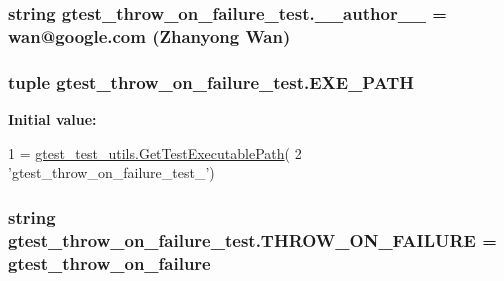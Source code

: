\subsubsection[{\+\_\+\+\_\+author\+\_\+\+\_\+}]{\setlength{\rightskip}{0pt plus 5cm}string gtest\+\_\+throw\+\_\+on\+\_\+failure\+\_\+test.\+\_\+\+\_\+author\+\_\+\+\_\+ = \textquotesingle{}wan@google.\+com (Zhanyong Wan)\textquotesingle{}}\label{namespacegtest__throw__on__failure__test_afd3c4d4809a79f0b4de8b2372cba5bb8}
\hypertarget{namespacegtest__throw__on__failure__test_a21b57c780e17de8f6aa8c88652b290be}{}
\subsubsection[{E\+X\+E\+\_\+\+P\+A\+T\+H}]{\setlength{\rightskip}{0pt plus 5cm}tuple gtest\+\_\+throw\+\_\+on\+\_\+failure\+\_\+test.\+E\+X\+E\+\_\+\+P\+A\+T\+H}\label{namespacegtest__throw__on__failure__test_a21b57c780e17de8f6aa8c88652b290be}
{\bfseries Initial value\+:}
\begin{DoxyCode}
1 = \hyperlink{namespacegtest__test__utils_a1bdf3cac86afa675ed37629b183048e9}{gtest\_test\_utils.GetTestExecutablePath}(
2     \textcolor{stringliteral}{'gtest\_throw\_on\_failure\_test\_'})
\end{DoxyCode}
\hypertarget{namespacegtest__throw__on__failure__test_af837d05b7ed8498aed8202c1d83d1e7a}{}
\subsubsection[{T\+H\+R\+O\+W\+\_\+\+O\+N\+\_\+\+F\+A\+I\+L\+U\+R\+E}]{\setlength{\rightskip}{0pt plus 5cm}string gtest\+\_\+throw\+\_\+on\+\_\+failure\+\_\+test.\+T\+H\+R\+O\+W\+\_\+\+O\+N\+\_\+\+F\+A\+I\+L\+U\+R\+E = \textquotesingle{}gtest\+\_\+throw\+\_\+on\+\_\+failure\textquotesingle{}}\label{namespacegtest__throw__on__failure__test_af837d05b7ed8498aed8202c1d83d1e7a}
